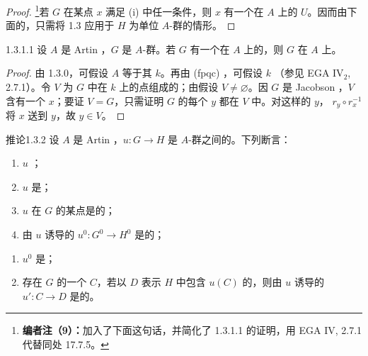 \begin{proof}
\footnote{\textbf{编者注（9）：}加入了下面这句话，并简化了 1.3.1.1 的证明，用 EGA IV, 2.7.1 代替同处 17.7.5。}若 $G$ 在某点 $x$ 满足 (i) 中任一条件，则 $x$ 有一个在 $A$ 上的 $U$。因而由下面的，只需将 1.3 应用于 $H$ 为单位 $A$-群的情形。
\end{proof}
\begin{SGAresult}{}{1.3.1.1}
设 $A$ 是 Artin ，$G$ 是 $A$-群。若 $G$ 有一个在 $A$ 上的，则 $G$ 在 $A$ 上。
\end{SGAresult}
\begin{proof}
由 1.3.0，可假设 $A$ 等于其 $k$。再由 (fpqc) ，可假设 $k$ （参见 EGA IV$_2$, 2.7.1）。令 $V$ 为 $G$ 中在 $k$ 上的点组成的；由假设 $V\ne\varnothing$。因 $G$ 是 Jacobson ，$V$ 含有一个 $x$；要证 $V=G$，只需证明 $G$ 的每个 $y$ 都在 $V$ 中。对这样的 $y$， $r_y\circ r_x^{-1}$ 将 $x$ 送到 $y$，故 $y\in V$。
\end{proof}
\begin{SGAresult}{推论}{1.3.2}
设 $A$ 是 Artin ，$u:G\to H$ 是 $A$-群之间的。下列断言：
\begin{enumerate}
\item[(i)] $u$ ；
\item[(ii)] $u$ 是；
\item[(iii)] $u$ 在 $G$ 的某点是的；
\item[(iv)] 由 $u$ 诱导的 $u^0:G^0\to H^0$ 是的；
\end{enumerate}
\begin{enumerate}
\item[(iv$'$)] $u^0$ 是；
\item[(v)] 存在 $G$ 的一个 $C$，若以 $D$ 表示 $H$ 中包含 $u(C)$ 的，则由 $u$ 诱导的 $u':C\to D$ 是的。
\end{enumerate}
\end{SGAresult}
